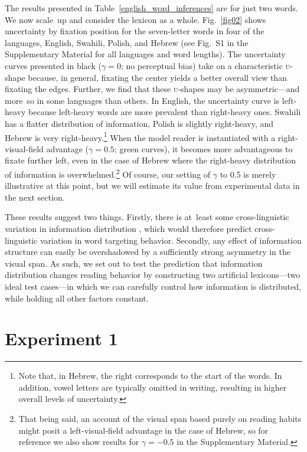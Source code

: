 \documentclass[doc,biblatex]{apa7}
\begin{document}
The results presented in Table~\ref{english_word_inferences} are for just two words. We now scale~up and consider the lexicon as a whole. Fig.~\ref{fig02} shows uncertainty by fixation position for the seven-letter words in four of the languages, English, Swahili, Polish, and Hebrew (see Fig.~S1 in the Supplementary Material for all languages and word lengths). The uncertainty curves presented in black ($\gamma = 0$; no perceptual bias) take on a characteristic \textsc{u}-shape because, in general, fixating the center yields a better overall view than fixating the edges. Further, we find that these \textsc{u}-shapes may be asymmetric---and more~so in some languages than others. In English, the uncertainty curve is left-heavy because left-heavy words are more prevalent than right-heavy ones. Swahili has a flatter distribution of information, Polish is slightly right-heavy, and Hebrew is very right-heavy.\footnote{Note that, in Hebrew, the right corresponds to the start of the words. In addition, vowel letters are typically omitted in writing, resulting in higher overall levels of uncertainty.} When the model reader is instantiated with a right-visual-field advantage ($\gamma = 0.5$; green curves), it becomes more advantageous to fixate further left, even in the case of Hebrew where the right-heavy distribution of information is overwhelmed.\footnote{That being said, an account of the visual span based purely on reading habits might posit a left-visual-field advantage in the case of Hebrew, so for reference we also show results for $\gamma = -0.5$ in the Supplementary Material.} Of course, our setting of $\gamma$ to 0.5 is merely illustrative at this point, but we will estimate its value from experimental data in the next section.

These results suggest two things. Firstly, there is at~least some cross-linguistic variation in information distribution \parencite[see also][]{Shafir:2022}, which would therefore predict cross-linguistic variation in word targeting behavior. Secondly, any effect of information structure can easily be overshadowed by a sufficiently strong asymmetry in the visual span. As such, we set out to test the prediction that information distribution changes reading behavior by constructing two artificial lexicons---two ideal test cases---in which we can carefully control how information is distributed, while holding all other factors constant.

\section{Experiment 1}
\end{document}

